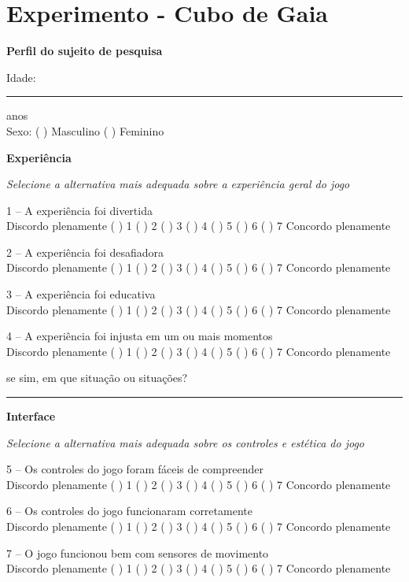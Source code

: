 \chapter{Experimento - Cubo de Gaia} \label{apendice:questionario}
\cleardoublepage

\noindent
\setlength{\parindent}{0pt}

\textbf{Perfil do sujeito de pesquisa}

Idade: \noindent\rule{1.5cm}{0.4pt} anos \\
Sexo: ( ) Masculino ( ) Feminino

\textbf{Experiência}

\textit{Selecione a alternativa mais adequada sobre a experiência geral do jogo}

1 – A experiência foi divertida \\
Discordo plenamente ( ) 1 ( ) 2 ( ) 3 ( ) 4 ( ) 5 ( ) 6 ( ) 7 Concordo plenamente

2 – A experiência foi desafiadora \\
Discordo plenamente ( ) 1 ( ) 2 ( ) 3 ( ) 4 ( ) 5 ( ) 6 ( ) 7 Concordo plenamente

3 – A experiência foi educativa \\
Discordo plenamente ( ) 1 ( ) 2 ( ) 3 ( ) 4 ( ) 5 ( ) 6 ( ) 7 Concordo plenamente

4 – A experiência foi injusta em um ou mais momentos \\
Discordo plenamente ( ) 1 ( ) 2 ( ) 3 ( ) 4 ( ) 5 ( ) 6 ( ) 7 Concordo plenamente

se sim, em que situação ou situações?

\rule{\linewidth-\marginparwidth}{0.4pt}


\textbf{Interface}

\textit{Selecione a alternativa mais adequada sobre os controles e estética do jogo}

5 – Os controles do jogo foram fáceis de compreender \\
Discordo plenamente ( ) 1 ( ) 2 ( ) 3 ( ) 4 ( ) 5 ( ) 6 ( ) 7 Concordo plenamente

6 – Os controles do jogo funcionaram corretamente \\
Discordo plenamente ( ) 1 ( ) 2 ( ) 3 ( ) 4 ( ) 5 ( ) 6 ( ) 7 Concordo plenamente

7 – O jogo funcionou bem com sensores de movimento \\
Discordo plenamente ( ) 1 ( ) 2 ( ) 3 ( ) 4 ( ) 5 ( ) 6 ( ) 7 Concordo plenamente


